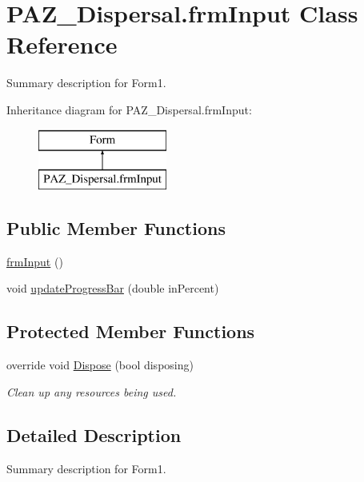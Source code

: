 \hypertarget{class_p_a_z___dispersal_1_1frm_input}{\section{P\-A\-Z\-\_\-\-Dispersal.\-frm\-Input Class Reference}
\label{class_p_a_z___dispersal_1_1frm_input}
}


Summary description for Form1.  


Inheritance diagram for P\-A\-Z\-\_\-\-Dispersal.\-frm\-Input\-:\begin{figure}[H]
\begin{center}
\leavevmode
\includegraphics[height=2.000000cm]{class_p_a_z___dispersal_1_1frm_input}
\end{center}
\end{figure}
\subsection*{Public Member Functions}
\begin{DoxyCompactItemize}
\item 
\hyperlink{class_p_a_z___dispersal_1_1frm_input_a871195feb97b983bf5c8a6140e70ca31}{frm\-Input} ()
\item 
void \hyperlink{class_p_a_z___dispersal_1_1frm_input_a1dfe15934a03b5d0cfec18825c722b80}{update\-Progress\-Bar} (double in\-Percent)
\end{DoxyCompactItemize}
\subsection*{Protected Member Functions}
\begin{DoxyCompactItemize}
\item 
override void \hyperlink{class_p_a_z___dispersal_1_1frm_input_a9d28a4de678a01361c1eebfceb5c7057}{Dispose} (bool disposing)
\begin{DoxyCompactList}\small\item\em Clean up any resources being used. \end{DoxyCompactList}\end{DoxyCompactItemize}


\subsection{Detailed Description}
Summary description for Form1. 



